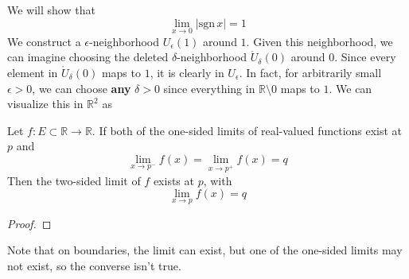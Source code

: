   \begin{example}
    \label{ex:limit-of-absolute-value-of-signum-function}
    We will show that 
    \begin{equation}
      \lim_{x \to 0} |\text{sgn}\,x| = 1
    \end{equation}
    We construct a $\epsilon$-neighborhood $U_\epsilon (1)$ around $1$. Given this neighborhood, we can imagine choosing the deleted $\delta$-neighborhood $\mathring{U}_\delta (0)$ around $0$. Since every element in $\mathring{U}_\delta (0)$ maps to $1$, it is clearly in $U_\epsilon$. In fact, for arbitrarily small $\epsilon > 0$, we can choose \textbf{any} $\delta>0$ since everything in $\mathbb{R} \setminus 0$ maps to $1$. We can visualize this in $\mathbb{R}^2$ as
  \end{example}

  \begin{theorem}
    \label{thm:two-one-sided}
    Let $f: E \subset \mathbb{R} \to \mathbb{R}$. If both of the one-sided limits of real-valued functions exist at $p$ and 
    \begin{equation}
      \lim_{x \to p^-} f(x) = \lim_{x \to p^+} f(x) = q
    \end{equation}
    Then the two-sided limit of $f$ exists at $p$, with 
    \begin{equation}
      \lim_{x \to p} f(x) = q
    \end{equation}
  \end{theorem}
  \begin{proof}
    
  \end{proof}

  Note that on boundaries, the limit can exist, but one of the one-sided limits may not exist, so the converse isn't true. 

